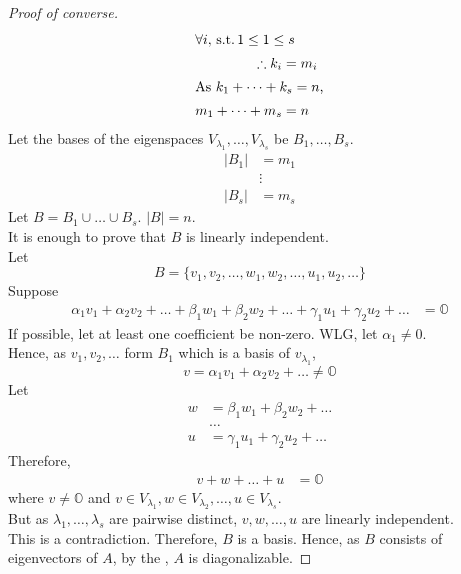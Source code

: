 \documentclass[fleqn, a4paper, 12pt, draft]{article}
\theoremstyle{definition}
\theoremstyle{theorem}
\theoremstyle{remark}
\newcommand{\suchthat}{\mathrm{\,s.t.\,}}
\numberwithin{corollary}{theorem}
\numberwithin{equation}{theorem}
\begin{document}
\begin{proof}[Proof of converse]
	\begin{align*}
	\intertext{$\forall i, \suchthat 1 \leq 1 \leq s$}
	\therefore k_i &= m_i\\
	\intertext{As $k_1 + \dots + k_s = n$,}
	m_1 + \dots + m_s &= n
	\end{align*}
	Let the bases of the eigenspaces $V_{\lambda_1}, \dots, V_{\lambda_s}$ be $B_1, \dots, B_s$.
	\begin{align*}
		|B_1| &= m_1\\
		&\vdots\\
		|B_s| &= m_s
	\end{align*}
	Let $B = B_1 \cup \dots \cup B_s$. $|B| = n$.\\
	It is enough to prove that $B$ is linearly independent.\\
	Let 
	\begin{equation*}
		B = \{v_1, v_2, \dots, w_1, w_2, \dots, u_1, u_2, \dots\}
	\end{equation*}
	Suppose
	\begin{align*}
		\alpha_1 v_1 + \alpha_2 v_2 + \dots + \beta_1 w_1 + \beta_2 w_2 + \dots + \gamma_1 u_1 + \gamma_2 u_2 + \dots &= \mathbb{O}
	\end{align*}
	If possible, let at least one coefficient be non-zero. WLG, let $\alpha_1 \neq 0$.\\
	Hence, as $v_1, v_2, \dots$ form $B_1$ which is a basis of $v_{\lambda_1}$,
	\begin{equation*}
		v = \alpha_1 v_1 + \alpha_2 v_2 + \dots \neq \mathbb{O}
	\end{equation*}
	Let
	\begin{align*}
		w &= \beta_1 w_1 + \beta_2 w_2 + \dots\\
		&\dots\\
		u &= \gamma_1 u_1 + \gamma_2 u_2 + \dots
	\end{align*}
	Therefore,
	\begin{align*}
		v + w + \dots + u &= \mathbb{O}
	\end{align*}
		where $v \neq \mathbb{O}$ and $v \in V_{\lambda_1}, w \in V_{\lambda_2}, \dots, u \in V_{\lambda_s}$.\\
		But as $\lambda_1, \dots, \lambda_s$ are pairwise distinct, $v, w, \dots, u$ are linearly independent.\\
		This is a contradiction. Therefore, $B$ is a basis. Hence, as $B$ consists of eigenvectors of $A$, by the , $A$ is diagonalizable.
\end{proof}
\end{document}

